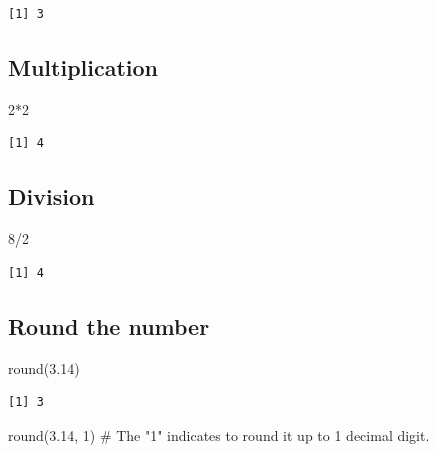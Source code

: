 \documentclass[
  letterpaper,
  DIV=11,
  numbers=noendperiod]{scrreprt}
\newenvironment{Shaded}{\begin{snugshade}}{\end{snugshade}}
\newcommand{\CommentTok}[1]{\textcolor[rgb]{0.37,0.37,0.37}{#1}}
\newcommand{\DecValTok}[1]{\textcolor[rgb]{0.68,0.00,0.00}{#1}}
\newcommand{\FloatTok}[1]{\textcolor[rgb]{0.68,0.00,0.00}{#1}}
\newcommand{\FunctionTok}[1]{\textcolor[rgb]{0.28,0.35,0.67}{#1}}
\newcommand{\NormalTok}[1]{\textcolor[rgb]{0.00,0.23,0.31}{#1}}
\newcommand{\SpecialCharTok}[1]{\textcolor[rgb]{0.37,0.37,0.37}{#1}}
\begin{document}
\begin{verbatim}
[1] 3
\end{verbatim}

\subsection{Multiplication}\label{multiplication}

\begin{Shaded}
\begin{Highlighting}[]
\DecValTok{2}\SpecialCharTok{*}\DecValTok{2}
\end{Highlighting}
\end{Shaded}

\begin{verbatim}
[1] 4
\end{verbatim}

\subsection{Division}\label{division}

\begin{Shaded}
\begin{Highlighting}[]
\DecValTok{8}\SpecialCharTok{/}\DecValTok{2}
\end{Highlighting}
\end{Shaded}

\begin{verbatim}
[1] 4
\end{verbatim}

\subsection{Round the number}\label{round-the-number}

\begin{Shaded}
\begin{Highlighting}[]
\FunctionTok{round}\NormalTok{(}\FloatTok{3.14}\NormalTok{)}
\end{Highlighting}
\end{Shaded}

\begin{verbatim}
[1] 3
\end{verbatim}

\begin{Shaded}
\begin{Highlighting}[]
\FunctionTok{round}\NormalTok{(}\FloatTok{3.14}\NormalTok{, }\DecValTok{1}\NormalTok{) }\CommentTok{\# The "1" indicates to round it up to 1 decimal digit.}
\end{Highlighting}
\end{Shaded}
\end{document}
